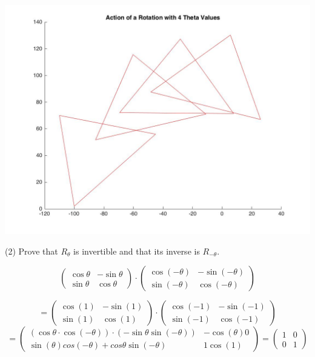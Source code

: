 \documentclass[12pt]{article}
\begin{document}
\includegraphics[scale=.25]{RotationPlot}

\medskip
(2)
Prove that $R_{\theta}$ is invertible and that its inverse is
$R_{-\theta}$.

\[
\begin{pmatrix}
\cos\theta & -\sin\theta \\
\sin\theta & \cos\theta
\end{pmatrix}
\cdot
\begin{pmatrix}
\cos(-\theta) & -\sin(-\theta) \\
\sin(-\theta) & \cos(-\theta)
\end{pmatrix}
\]

\[
=
\begin{pmatrix}
\cos(1) & -\sin(1) \\
\sin(1) & \cos(1)
\end{pmatrix}
\cdot
\begin{pmatrix}
\cos(-1) & -\sin(-1) \\
\sin(-1) & \cos(-1)
\end{pmatrix}
\]
\[
=
\begin{pmatrix}
(\cos\theta \cdot \cos(-\theta)) \cdot (-\sin\theta \sin(-\theta)) & -\cos(\theta)0 \\
\sin(\theta)cos(-\theta)+cos\theta \sin(-\theta) & 1\cos(1)
\end{pmatrix}
=
\begin{pmatrix}
1 & 0 \\
0 & 1
\end{pmatrix}
\]
\end{document}
